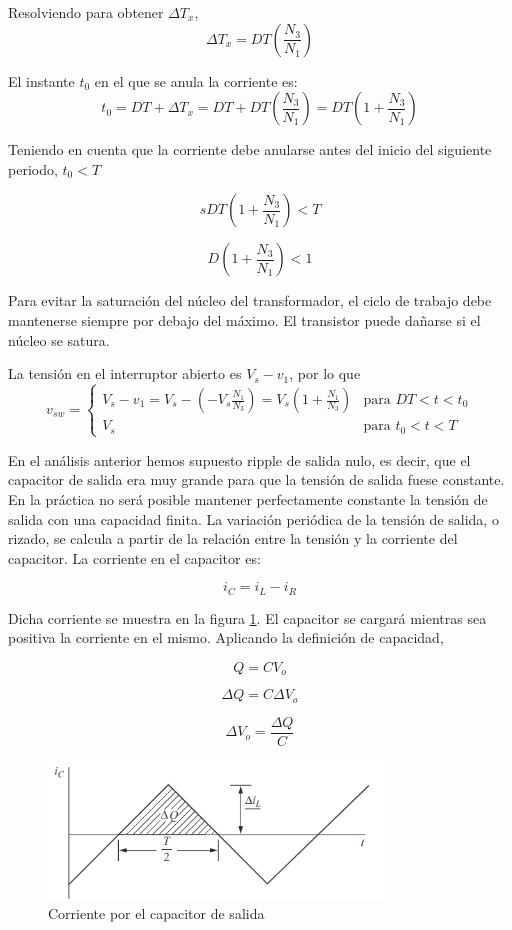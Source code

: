Resolviendo para obtener $\Delta T_x$,
$$ \Delta T_x=DT\left(\frac{N_3}{N_1}\right) $$

El instante $t_0$ en el que se anula la corriente es:
$$ t_0=DT+\Delta T_x=DT+DT\left(\frac{N_3}{N_1}\right)=DT\left(1+\frac{N_3}{N_1}\right) $$

Teniendo en cuenta que la corriente debe anularse antes del inicio del siguiente periodo,
$t_0<T$

$$ sDT\left(1+\frac{N_3}{N_1}\right)<T $$

$$ D\left(1+\frac{N_3}{N_1}\right)<1 $$

Para evitar la saturación del núcleo del transformador, el ciclo de trabajo debe mantenerse siempre por debajo del máximo.
El transistor puede dañarse si el núcleo se satura.

La tensión en el interruptor abierto es $V_s-v_1$, por lo que
$$
v_{sw}=
\begin{cases}
    V_s-v_1=V_s-\left(-V_s\frac{N_1}{N_3}\right)=V_s\left(1+\frac{N_1}{N_3}\right) & \text{para $DT<t<t_0$}\\
    V_s & \text{para $t_0<t<T$}
\end{cases}
$$



En el análisis anterior hemos supuesto ripple de salida nulo, es decir, que el capacitor de salida era muy grande para que la tensión
de salida fuese constante. En la práctica no será posible mantener perfectamente constante la
tensión de salida con una capacidad finita. La variación periódica de la tensión de salida, o rizado,
se calcula a partir de la relación entre la tensión y la corriente del capacitor. 
La corriente en el capacitor es:

$$ i_C=i_L-i_R $$

Dicha corriente se muestra en la figura \ref{fig:buck_converter_capacitor_current}.
El capacitor se cargará mientras sea positiva la corriente en el mismo. Aplicando la definición de capacidad,

$$ Q=CV_o $$

$$ \Delta Q=C\Delta V_o $$

$$ \Delta V_o=\frac{\Delta Q}{C} $$

\begin{figure}[ht]
    \centering
    \includegraphics[width=0.8\textwidth]{../images/hart/buck_converter_capacitor_current.png}
    \caption{Corriente por el capacitor de salida}
    \label{fig:buck_converter_capacitor_current}
\end{figure}

